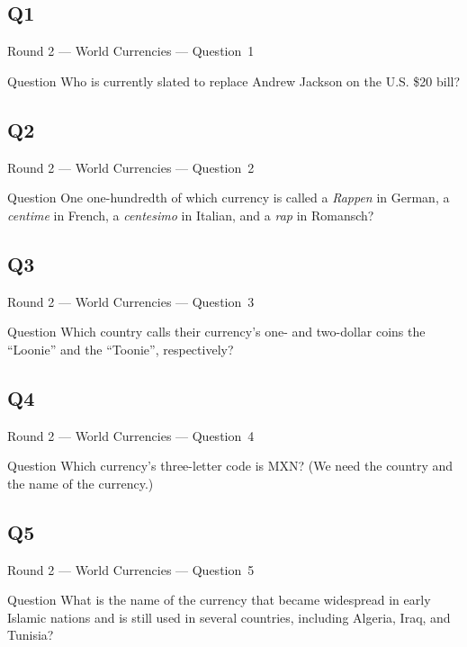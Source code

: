 \documentclass[11pt]{beamer}
\begin{document}
\subsection*{Q1}
\begin{frame}[t]{Round 2 --- World Currencies --- \mbox{Question 1}}
\vspace{-0.5em}
\begin{block}{Question}
Who is currently slated to replace Andrew Jackson on the U.S. \$20 bill?
\end{block}
\end{frame}
\subsection*{Q2}
\begin{frame}[t]{Round 2 --- World Currencies --- \mbox{Question 2}}
\vspace{-0.5em}
\begin{block}{Question}
One one-hundredth of which currency is called a \emph{Rappen} in German, a \emph{centime} in French, a \emph{centesimo} in Italian, and a \emph{rap} in Romansch?
\end{block}
\end{frame}
\subsection*{Q3}
\begin{frame}[t]{Round 2 --- World Currencies --- \mbox{Question 3}}
\vspace{-0.5em}
\begin{block}{Question}
Which country calls their currency's one- and two-dollar coins the ``Loonie'' and the ``Toonie'', respectively?
\end{block}
\end{frame}
\subsection*{Q4}
\begin{frame}[t]{Round 2 --- World Currencies --- \mbox{Question 4}}
\vspace{-0.5em}
\begin{block}{Question}
Which currency's three-letter code is MXN\@? (We need the country and the name of the currency.)
\end{block}
\end{frame}
\subsection*{Q5}
\begin{frame}[t]{Round 2 --- World Currencies --- \mbox{Question 5}}
\vspace{-0.5em}
\begin{block}{Question}
What is the name of the currency that became widespread in early Islamic nations and is still used in several countries, including Algeria, Iraq, and Tunisia?
\end{block}
\end{frame}
\end{document}
